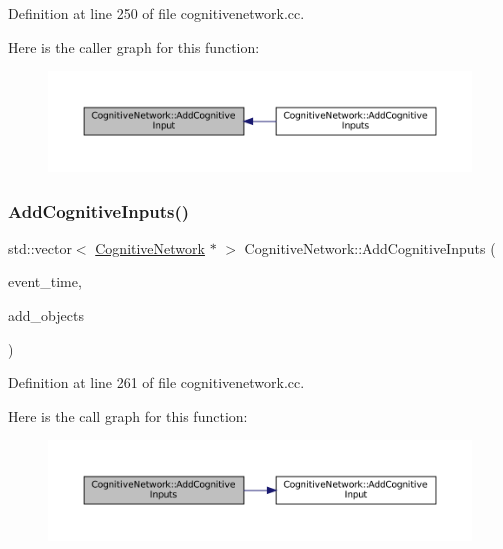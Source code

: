 Definition at line 250 of file cognitivenetwork.\+cc.

Here is the caller graph for this function\+:\nopagebreak
\begin{figure}[H]
\begin{center}
\leavevmode
\includegraphics[width=350pt]{class_cognitive_network_a6af57693982286ac6a6831ca3010b760_icgraph}
\end{center}
\end{figure}
\mbox{\label{class_cognitive_network_afc92c9b378e7e0873d0164bc4f2635df}} 
\subsubsection{\texorpdfstring{Add\+Cognitive\+Inputs()}{AddCognitiveInputs()}}
{\footnotesize\ttfamily std\+::vector$<$ \mbox{\hyperlink{class_cognitive_network}{Cognitive\+Network}} $\ast$ $>$ Cognitive\+Network\+::\+Add\+Cognitive\+Inputs (\begin{DoxyParamCaption}\item[{std\+::chrono\+::time\+\_\+point$<$ \mbox{\hyperlink{universe_8h_a0ef8d951d1ca5ab3cfaf7ab4c7a6fd80}{Clock}} $>$}]{event\+\_\+time,  }\item[{std\+::vector$<$ \mbox{\hyperlink{class_cognitive_network}{Cognitive\+Network}} $\ast$$>$}]{add\+\_\+objects }\end{DoxyParamCaption})}



Definition at line 261 of file cognitivenetwork.\+cc.

Here is the call graph for this function\+:\nopagebreak
\begin{figure}[H]
\begin{center}
\leavevmode
\includegraphics[width=350pt]{class_cognitive_network_afc92c9b378e7e0873d0164bc4f2635df_cgraph}
\end{center}
\end{figure}
\mbox{\label{class_cognitive_network_a8a9b533b89b7d62b21cf41bdf957ef14}} 
